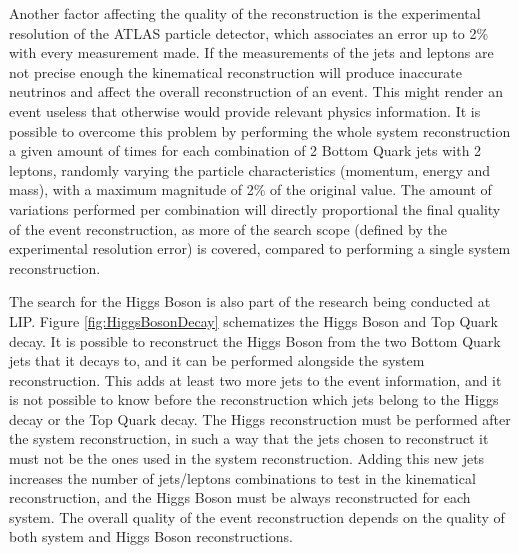 Another factor affecting the quality of the reconstruction is the experimental resolution of the ATLAS particle detector, which associates an error up to 2\% with every measurement made. If the measurements of the jets and leptons are not precise enough the kinematical reconstruction will produce inaccurate neutrinos and affect the overall reconstruction of an event. This might render an event useless that otherwise would provide relevant physics information. It is possible to overcome this problem by performing the whole \ttbar system reconstruction a given amount of times for each combination of 2 Bottom Quark jets with 2 leptons, randomly varying the particle characteristics (momentum, energy and mass), with a maximum magnitude of 2\% of the original value. The amount of variations performed per combination will directly proportional the final quality of the event reconstruction, as more of the search scope (defined by the experimental resolution error) is covered, compared to performing a single \ttbar system reconstruction.

The search for the Higgs Boson is also part of the research being conducted at LIP. Figure \ref{fig:HiggsBosonDecay} schematizes the Higgs Boson and Top Quark decay. It is possible to reconstruct the Higgs Boson from the two Bottom Quark jets that it decays to, and it can be performed alongside the \ttbar system reconstruction. This adds at least two more jets to the event information, and it is not possible to know before the reconstruction which jets belong to the Higgs decay or the Top Quark decay. The Higgs reconstruction must be performed after the \ttbar system reconstruction, in such a way that the jets chosen to reconstruct it must not be the ones used in the \ttbar system reconstruction. Adding this new jets increases the number of jets/leptons combinations to test in the kinematical reconstruction, and the Higgs Boson must be always reconstructed for each \ttbar system. The overall quality of the event reconstruction depends on the quality of both \ttbar system and Higgs Boson reconstructions.

